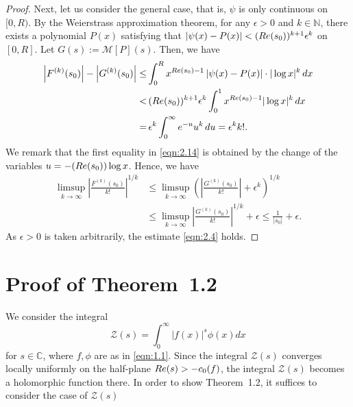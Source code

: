 \documentclass[10pt,a4paper]{amsart}
\numberwithin{equation}{section}
\newcommand{\C}{{\mathbb C}}
\newcommand{\N}{{\mathbb N}}
\newcommand{\1}{{\bf 1}}
\begin{document}
\begin{proof}
Next, 
let us consider the general case, that is, 
$\psi$ is only continuous on $[0,R)$.
By the Weierstrass approximation theorem,
for any $\epsilon>0$ and $k \in \N$,
there exists a polynomial $P(x)$ 
satisfying that 
$|\psi(x) - P(x)| < ({\rm Re}(s_0))^{k+1}\epsilon^k$ 
on $[0,R]$.
Let $G(s):={\mathcal M}[P](s)$. 
Then, 
we have
\begin{equation}\label{eqn:2.14}
\begin{split}
\left|F^{(k)}(s_0)\right| - \left|G^{(k)}(s_0)\right|  
\le& \int_0^R x^{{\rm Re}(s_0)-1}
\left|\psi(x) - P(x)\right|\cdot|\log x|^k\,dx \\
<& \,({\rm Re}(s_0))^{k+1}\epsilon^k
\int_0^{1} x^{{\rm Re}(s_0)-1}|\log x|^k\,dx\\
=& \,\epsilon^k\int_0^{\infty}e^{-u} u^k \,du
=\epsilon^k k!.
\end{split}
\end{equation}
We remark that
the first equality in 
\eqref{eqn:2.14} is obtained 
by the change of the variables 
$u=-({\rm Re}(s_0))\log x$.
Hence, we have 
\begin{equation*}
\begin{split}
\limsup_{k \to \infty}
\left| \frac{F^{(k)}(s_0)}{k!} \right|^{1/k} 
&\le \limsup_{k \to \infty}
\left(\left| \frac{G^{(k)}(s_0)}{k!}\right| 
+\epsilon^{k}\right)^{1/k}\\
&\le \limsup_{k \to \infty}
\left| \frac{G^{(k)}(s_0)}{k!} \right|^{1/k} 
+ \epsilon
\leq \frac{1}{|s_0|} + \epsilon.
\end{split}
\end{equation*}
As $\epsilon>0$ is taken arbitrarily, 
the estimate \eqref{eqn:2.4} holds.
\end{proof}


\section{Proof of Theorem~1.2}

We consider the integral
\begin{equation}\label{eqn:3.1}
{\mathcal Z}(s)=\int_{0}^{\infty}|f(x)|^s \phi(x)dx
\end{equation}
for $s\in\C$,  
where $f, \phi$ are as in \eqref{eqn:1.1}.
Since the integral ${\mathcal Z}(s)$ converges 
locally uniformly on the half-plane ${\rm Re}(s)>-c_{0}(f)$,
the integral ${\mathcal Z}(s)$ becomes 
a holomorphic function there.
In order to show Theorem~1.2, 
it suffices to consider the case of 
$\mathcal{Z}(s)$
\end{document}
